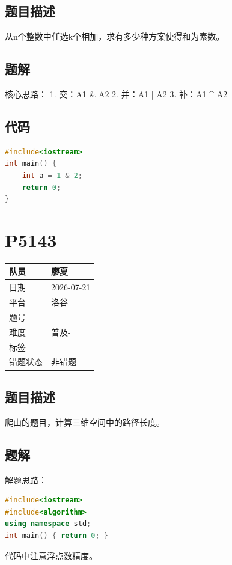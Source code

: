 \documentclass[12pt,a4paper]{ctexart}
\begin{document}
\subsection{题目描述}
从n个整数中任选k个相加，求有多少种方案使得和为素数。

\subsection{题解}
核心思路：
1. 交：A1 \& A2
2. 并：A1 | A2
3. 补：A1 \^{} A2

\subsection{代码}
\begin{lstlisting}[language=C++]
#include<iostream>
int main() {
    int a = 1 & 2;
    return 0;
}

\end{lstlisting}


\section{P5143}
\begin{tabular}{|l|l|}
\hline
队员 & 廖夏 \\ \hline
日期 & 2026-07-21 \\ \hline
平台 & 洛谷 \\ \hline
题号 &  \\ \hline
难度 & 普及- \\ \hline
标签 &  \\ \hline
错题状态 & 非错题 \\ \hline
\end{tabular}

\subsection{题目描述}
爬山的题目，计算三维空间中的路径长度。

\subsection{题解}
解题思路：

\begin{lstlisting}[language=C++]
#include<iostream>
#include<algorithm>
using namespace std;
int main() { return 0; }

\end{lstlisting}

代码中注意浮点数精度。
\end{document}
